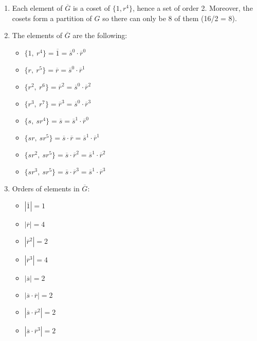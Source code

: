 \begin{solution}
    \begin{enumerate}[label = \textbf{(\alph*)}]
        \item Each element of $\overline{G}$ is a coset of $\{1, r^4\}$, hence a set of order 2. Moreover, the cosets form a partition of $G$ so there can only be 8 of them (16/2 = 8).
        \item The elements of $\overline{G}$ are the following:
        \begin{multicols}{2}\begin{itemize}
            \item $\{1, \ r^4\} = \overline{1} = \overline{s}^0\cdot\overline{r}^0$
            \item $\{r, \ r^5\} = \overline{r} = \overline{s}^0\cdot\overline{r}^1$
            \item $\{r^2, \ r^6\} = \overline{r}^2 = \overline{s}^0\cdot\overline{r}^2$
            \item $\{r^3, \ r^7\} = \overline{r}^3 = \overline{s}^0\cdot\overline{r}^3$
            \item $\{s, \ sr^4\} = \overline{s} = \overline{s}^1\cdot\overline{r}^0$
            \item $\{sr, \ sr^5\} = \overline{s}\cdot\overline{r} = \overline{s}^1\cdot\overline{r}^1$
            \item $\{sr^2, \ sr^5\} = \overline{s}\cdot\overline{r}^2 = \overline{s}^1\cdot\overline{r}^2$
            \item $\{sr^3, \ sr^5\} = \overline{s}\cdot\overline{r}^3 = \overline{s}^1\cdot\overline{r}^3$
        \end{itemize}
        \end{multicols}
        \item Orders of elements in $\overline{G}$:
        \begin{multicols}{2}\begin{itemize}
            \item $|\overline{1}| = 1$
            \item $|\overline{r}| = 4$
            \item $|\overline{r}^2| = 2$
            \item $|\overline{r}^3| = 4$
            \item $|\overline{s}| = 2$
            \item $|\overline{s}\cdot\overline{r}| = 2$
            \item $|\overline{s}\cdot\overline{r}^2| = 2$
            \item $|\overline{s}\cdot\overline{r}^3| = 2$
        \end{itemize}
        \end{multicols}


\end{enumerate}
\end{solution}
